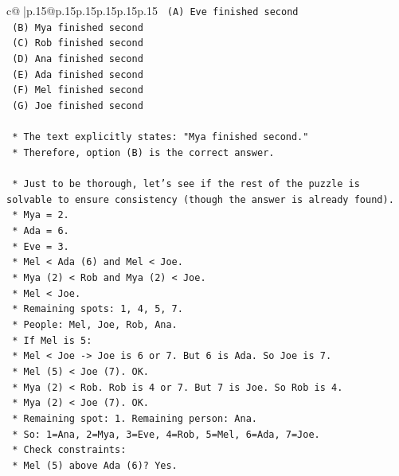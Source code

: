\documentclass{article}
\begin{document}
{\begin{supertabular}{c@{$\;$}|p{.15\linewidth}@{}p{.15\linewidth}p{.15\linewidth}p{.15\linewidth}p{.15\linewidth}p{.15\linewidth}}
{{{\texttt{        (A) Eve finished second} \\
\texttt{        (B) Mya finished second} \\
\texttt{        (C) Rob finished second} \\
\texttt{        (D) Ana finished second} \\
\texttt{        (E) Ada finished second} \\
\texttt{        (F) Mel finished second} \\
\texttt{        (G) Joe finished second} \\
\\ 
\texttt{    *   The text explicitly states: "Mya finished second."} \\
\texttt{    *   Therefore, option (B) is the correct answer.} \\
\\ 
\texttt{    *   Just to be thorough, let's see if the rest of the puzzle is solvable to ensure consistency (though the answer is already found).} \\
\texttt{        *   Mya = 2.} \\
\texttt{        *   Ada = 6.} \\
\texttt{        *   Eve = 3.} \\
\texttt{        *   Mel < Ada (6) and Mel < Joe.} \\
\texttt{        *   Mya (2) < Rob and Mya (2) < Joe.} \\
\texttt{        *   Mel < Joe.} \\
\texttt{        *   Remaining spots: 1, 4, 5, 7.} \\
\texttt{        *   People: Mel, Joe, Rob, Ana.} \\
\texttt{        *   If Mel is 5:} \\
\texttt{            *   Mel < Joe {-}> Joe is 6 or 7. But 6 is Ada. So Joe is 7.} \\
\texttt{            *   Mel (5) < Joe (7). OK.} \\
\texttt{            *   Mya (2) < Rob. Rob is 4 or 7. But 7 is Joe. So Rob is 4.} \\
\texttt{            *   Mya (2) < Joe (7). OK.} \\
\texttt{            *   Remaining spot: 1. Remaining person: Ana.} \\
\texttt{            *   So: 1=Ana, 2=Mya, 3=Eve, 4=Rob, 5=Mel, 6=Ada, 7=Joe.} \\
\texttt{            *   Check constraints:} \\
\texttt{                *   Mel (5) above Ada (6)? Yes.} \\
}}}
\end{supertabular}}
\end{document}

